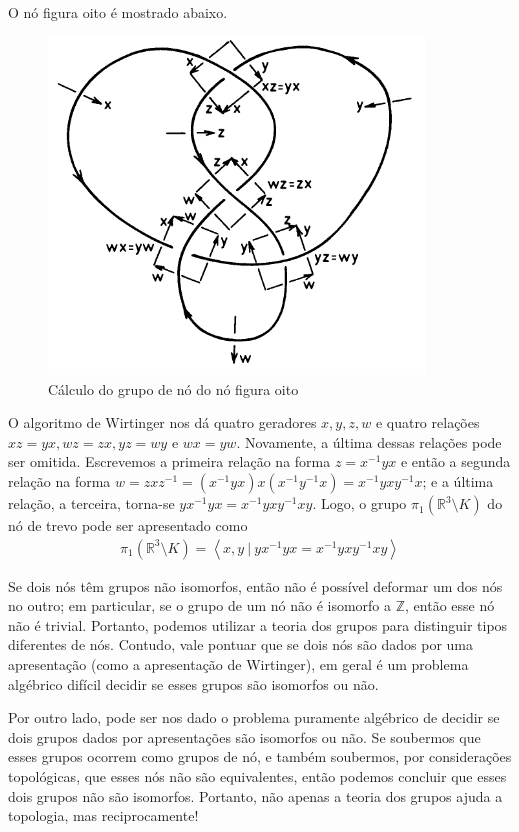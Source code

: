 	\begin{example}
		O nó figura oito é mostrado abaixo.
		\begin{figure}[H]
			\begin{center}
				\includegraphics[width=10cm]{Images/gruponooito.png}
			\end{center}\caption{Cálculo do grupo de nó do nó figura oito}
			\label{grupo no de oito}	
		\end{figure}
		\par\vspace{0.3cm} O algoritmo de Wirtinger nos dá quatro geradores $x,y,z,w$ e quatro relações $xz = yx, wz = zx, yz = wy$ e $wx = yw$. Novamente, a última dessas relações pode ser omitida. Escrevemos a primeira relação na forma $z = x^{-1}yx$ e então a segunda relação na forma $w = zxz^{-1} = (x^{-1}yx)x(x^{-1}y^{-1}x) = x^{-1}yxy^{-1}x$; e a última relação, a terceira, torna-se $yx^{-1}yx = x^{-1}yxy^{-1}xy$. Logo, o grupo $\pi_1(\mathbb{R}^3\setminus K)$ do nó de trevo pode ser apresentado como
		\begin{align*}
		\pi_1(\mathbb{R}^3\setminus K) = \left< x,y \ | \ yx^{-1}yx = x^{-1}yxy^{-1}xy \right>
		\end{align*}
	\end{example}
	\par\vspace{0.3cm} Se dois nós têm grupos não isomorfos, então não é possível deformar um dos nós no outro; em particular, se o grupo de um nó não é isomorfo a $\mathbb{Z}$, então esse nó não é trivial. Portanto, podemos utilizar a teoria dos grupos para distinguir tipos diferentes de nós. Contudo, vale pontuar que se dois nós são dados por uma apresentação (como a apresentação de Wirtinger), em geral é um problema algébrico difícil decidir se esses grupos são isomorfos ou não.
	\par\vspace{0.3cm} Por outro lado, pode ser nos dado o problema puramente algébrico de decidir se dois grupos dados por apresentações são isomorfos ou não. Se soubermos que esses grupos ocorrem como grupos de nó, e também soubermos, por considerações topológicas, que esses nós não são equivalentes, então podemos concluir que esses dois grupos não são isomorfos. Portanto, não apenas a teoria dos grupos ajuda a topologia, mas reciprocamente!
	
